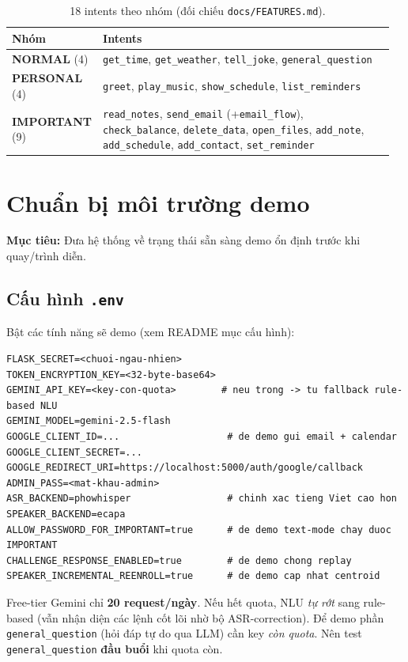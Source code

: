 \documentclass[12pt,a4paper]{article}
\newcommand{\role}[1]{\par\smallskip\noindent\textbf{\textcolor{hdr}{Mục tiêu:}} #1\par\smallskip}
\newcommand{\nrm}{\textcolor{normalc}{\textbf{NORMAL}}}
\newcommand{\imp}{\textcolor{importantc}{\textbf{IMPORTANT}}}
\newcommand{\per}{\textcolor{personalc}{\textbf{PERSONAL}}}
\begin{document}
\begin{table}[H]
\centering
\caption{18 intents theo nhóm (đối chiếu \texttt{docs/FEATURES.md}).}
\small
\begin{tabular}{p{0.16\linewidth}p{0.80\linewidth}}
\toprule
\textbf{Nhóm} & \textbf{Intents} \\
\midrule
\nrm{} (4) & \texttt{get\_time}, \texttt{get\_weather}, \texttt{tell\_joke}, \texttt{general\_question} \\
\per{} (4) & \texttt{greet}, \texttt{play\_music}, \texttt{show\_schedule}, \texttt{list\_reminders} \\
\imp{} (9) & \texttt{read\_notes}, \texttt{send\_email} (+\texttt{email\_flow}),
\texttt{check\_balance}, \texttt{delete\_data}, \texttt{open\_files},
\texttt{add\_note}, \texttt{add\_schedule}, \texttt{add\_contact}, \texttt{set\_reminder} \\
\bottomrule
\end{tabular}
\end{table}

\section{Chuẩn bị môi trường demo}
\role{Đưa hệ thống về trạng thái sẵn sàng demo ổn định trước khi quay/trình diễn.}

\subsection{Cấu hình \texttt{.env}}
Bật các tính năng sẽ demo (xem README mục cấu hình):
\begin{lstlisting}
FLASK_SECRET=<chuoi-ngau-nhien>
TOKEN_ENCRYPTION_KEY=<32-byte-base64>
GEMINI_API_KEY=<key-con-quota>        # neu trong -> tu fallback rule-based NLU
GEMINI_MODEL=gemini-2.5-flash
GOOGLE_CLIENT_ID=...                   # de demo gui email + calendar
GOOGLE_CLIENT_SECRET=...
GOOGLE_REDIRECT_URI=https://localhost:5000/auth/google/callback
ADMIN_PASS=<mat-khau-admin>
ASR_BACKEND=phowhisper                 # chinh xac tieng Viet cao hon
SPEAKER_BACKEND=ecapa
ALLOW_PASSWORD_FOR_IMPORTANT=true      # de demo text-mode chay duoc IMPORTANT
CHALLENGE_RESPONSE_ENABLED=true        # de demo chong replay
SPEAKER_INCREMENTAL_REENROLL=true      # de demo cap nhat centroid
\end{lstlisting}

\begin{luuybox}
Free-tier Gemini chỉ \textbf{20 request/ngày}. Nếu hết quota, NLU \emph{tự rớt}
sang rule-based (vẫn nhận diện các lệnh cốt lõi nhờ bộ ASR-correction). Để demo
phần \texttt{general\_question} (hỏi đáp tự do qua LLM) cần key \emph{còn quota}.
Nên test \texttt{general\_question} \textbf{đầu buổi} khi quota còn.
\end{luuybox}
\end{document}
